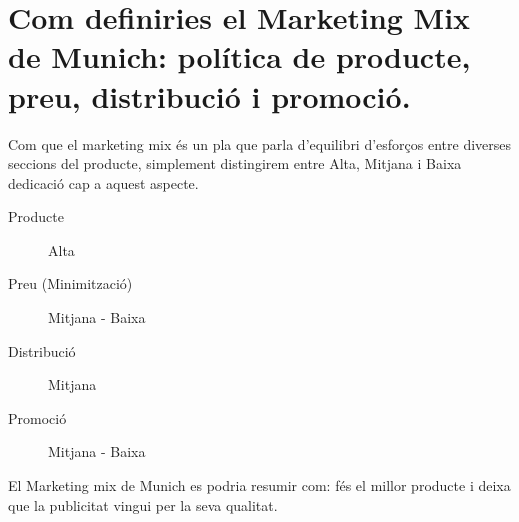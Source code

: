 \section{Com definiries el Marketing Mix de Munich: política de producte, preu,
distribució i promoció.}

Com que el marketing mix és un pla que parla d'equilibri d'esforços entre
diverses seccions del producte, simplement distingirem entre Alta, Mitjana
i Baixa dedicació cap a aquest aspecte.

\begin{description}
  \item[Producte] Alta
  \item[Preu (Minimització) ] Mitjana - Baixa 
  \item[Distribució] Mitjana 
  \item[Promoció] Mitjana - Baixa
\end{description}

El Marketing mix de Munich es podria resumir com: fés el millor producte i
deixa que la publicitat vingui per la seva qualitat.

